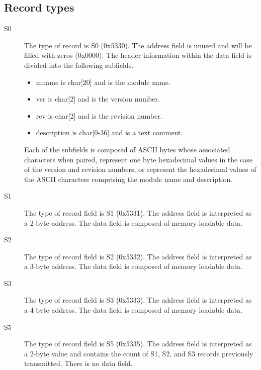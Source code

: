     \subsection{Record types}
        \begin{description}
            \item[S0]
                The type of record is S0 (0x5330). The address field is unused and will be filled with zeros (0x0000). The header information within the data field is divided into the following subfields.

                \begin{itemize}
                    \item mname is char[20] and is the module name.
                    \item ver is char[2] and is the version number.
                    \item rev is char[2] and is the revision number.
                    \item description is char[0-36] and is a text comment.
                \end{itemize}

                Each of the subfields is composed of ASCII bytes whose associated characters when paired, represent one byte hexadecimal values in the case of the version and revision numbers, or represent the hexadecimal values of the ASCII characters comprising the module name and description.

            \item[S1]
                The type of record field is S1 (0x5331). The address field is interpreted as a 2-byte address. The data field is composed of memory loadable data.

            \item[S2]
                The type of record field is S2 (0x5332). The address field is interpreted as a 3-byte address. The data field is composed of memory loadable data.

            \item[S3]
                The type of record field is S3 (0x5333). The address field is interpreted as a 4-byte address. The data field is composed of memory loadable data.

            \item[S5]
                The type of record field is S5 (0x5335). The address field is interpreted as a 2-byte value and contains the count of S1, S2, and S3 records previously transmitted. There is no data field.


\end{description}
